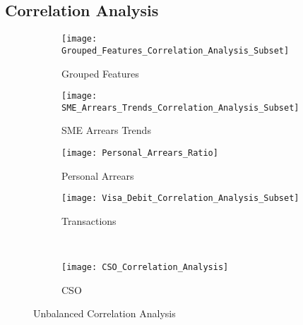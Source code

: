 \subsection{Correlation Analysis}

\begin{figure}[H]
	\centering
		\begin{subfigure}[b]{0.32\textwidth}
			\captionsetup{font=scriptsize}
			\texttt{[image: Grouped\_Features\_Correlation\_Analysis\_Subset]}\caption{Grouped Features}\label{fig:groupedFeaturesCorrelation}
		\end{subfigure} 
		\begin{subfigure}[b]{0.32\textwidth}
			\captionsetup{font=scriptsize}
			\texttt{[image: SME\_Arrears\_Trends\_Correlation\_Analysis\_Subset]}
			\caption{SME Arrears Trends}\label{fig:smeArrearsCorrelation}
		\end{subfigure} 
		\begin{subfigure}[b]{0.32\textwidth}
			\captionsetup{font=scriptsize}
			\texttt{[image: Personal\_Arrears\_Ratio]}
			\caption{Personal Arrears}\label{fig:personalArrearsCorrelation}
		\end{subfigure} 
	\medskip
	\begin{subfigure}[b]{0.32\textwidth}
		\captionsetup{font=scriptsize}
		\texttt{[image: Visa\_Debit\_Correlation\_Analysis\_Subset]}
		\caption{Transactions}\label{fig:transVisaCorrelation}
	\end{subfigure} ~\quad
	\begin{subfigure}[b]{0.32\textwidth}
		\captionsetup{font=scriptsize}
		\texttt{[image: CSO\_Correlation\_Analysis]}
		\caption{CSO}\label{fig:CSOCorrelation}
	\end{subfigure}
\caption{Unbalanced Correlation Analysis}
\label{fig:unbal_corr_analysis}
\end{figure}
	

